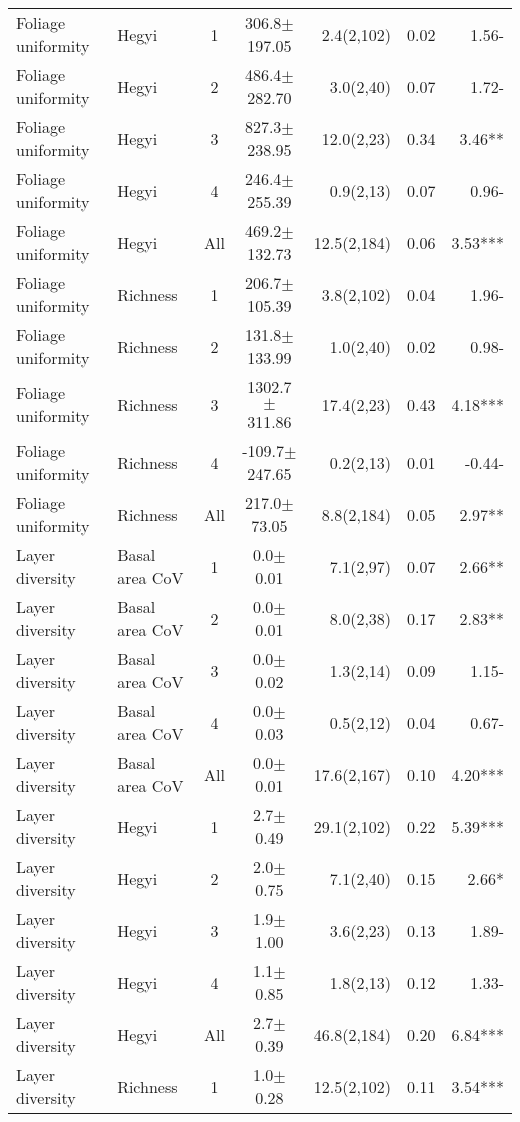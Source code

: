\begin{longtable}{llcS[table-format=5.1(4.2)]rS[table-format=1.2]r}
   \midrule
Foliage uniformity & Hegyi & 1 & 306.8$\pm$197.05 & 2.4(2,102) & 0.02 & 1.56- \\ 
  Foliage uniformity & Hegyi & 2 & 486.4$\pm$282.70 & 3.0(2,40) & 0.07 & 1.72- \\ 
  Foliage uniformity & Hegyi & 3 & 827.3$\pm$238.95 & 12.0(2,23) & 0.34 & 3.46** \\ 
  Foliage uniformity & Hegyi & 4 & 246.4$\pm$255.39 & 0.9(2,13) & 0.07 & 0.96- \\ 
  Foliage uniformity & Hegyi & All & 469.2$\pm$132.73 & 12.5(2,184) & 0.06 & 3.53*** \\ 
   \midrule
Foliage uniformity & Richness & 1 & 206.7$\pm$105.39 & 3.8(2,102) & 0.04 & 1.96- \\ 
  Foliage uniformity & Richness & 2 & 131.8$\pm$133.99 & 1.0(2,40) & 0.02 & 0.98- \\ 
  Foliage uniformity & Richness & 3 & 1302.7$\pm$311.86 & 17.4(2,23) & 0.43 & 4.18*** \\ 
  Foliage uniformity & Richness & 4 & -109.7$\pm$247.65 & 0.2(2,13) & 0.01 & -0.44- \\ 
  Foliage uniformity & Richness & All & 217.0$\pm$73.05 & 8.8(2,184) & 0.05 & 2.97** \\ 
   \midrule
Layer diversity & Basal area CoV & 1 & 0.0$\pm$0.01 & 7.1(2,97) & 0.07 & 2.66** \\ 
  Layer diversity & Basal area CoV & 2 & 0.0$\pm$0.01 & 8.0(2,38) & 0.17 & 2.83** \\ 
  Layer diversity & Basal area CoV & 3 & 0.0$\pm$0.02 & 1.3(2,14) & 0.09 & 1.15- \\ 
  Layer diversity & Basal area CoV & 4 & 0.0$\pm$0.03 & 0.5(2,12) & 0.04 & 0.67- \\ 
  Layer diversity & Basal area CoV & All & 0.0$\pm$0.01 & 17.6(2,167) & 0.10 & 4.20*** \\ 
   \midrule
Layer diversity & Hegyi & 1 & 2.7$\pm$0.49 & 29.1(2,102) & 0.22 & 5.39*** \\ 
  Layer diversity & Hegyi & 2 & 2.0$\pm$0.75 & 7.1(2,40) & 0.15 & 2.66* \\ 
  Layer diversity & Hegyi & 3 & 1.9$\pm$1.00 & 3.6(2,23) & 0.13 & 1.89- \\ 
  Layer diversity & Hegyi & 4 & 1.1$\pm$0.85 & 1.8(2,13) & 0.12 & 1.33- \\ 
  Layer diversity & Hegyi & All & 2.7$\pm$0.39 & 46.8(2,184) & 0.20 & 6.84*** \\ 
   \midrule
Layer diversity & Richness & 1 & 1.0$\pm$0.28 & 12.5(2,102) & 0.11 & 3.54*** \\ 

\end{longtable}

